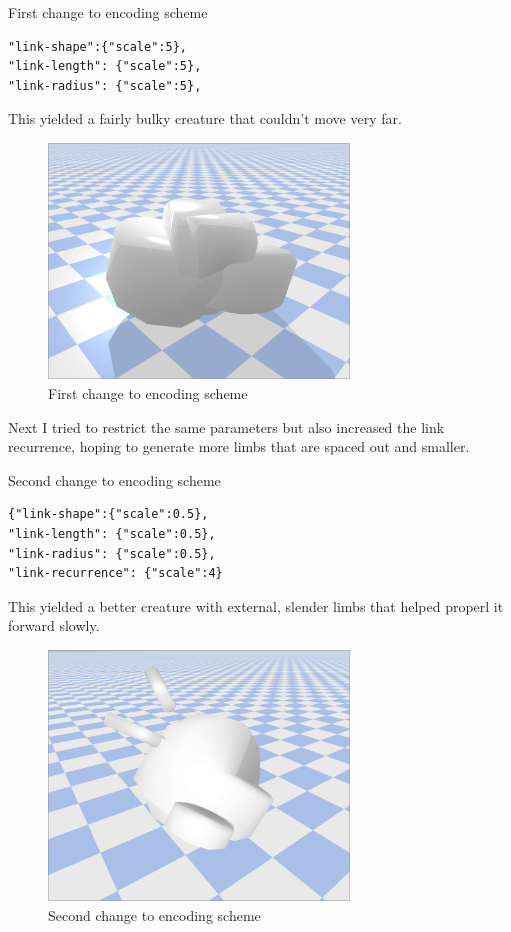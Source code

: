 \begin{listing}[H]
    \caption{First change to encoding scheme}
    \begin{lstlisting}
"link-shape":{"scale":5}, 
"link-length": {"scale":5},
"link-radius": {"scale":5},
    \end{lstlisting}
\end{listing}


This yielded a fairly bulky creature that couldn't move very far.

\begin{figure}[H]
    \centering
    \includegraphics[width=8cm]{cr1}
    \caption{First change to encoding scheme}
    \label{fig:cr1}
\end{figure}


Next I tried to restrict the same parameters but also increased the link recurrence, hoping to generate more limbs that are spaced out and smaller.

\begin{listing}[H]
    \caption{Second change to encoding scheme}
    \begin{lstlisting}
{"link-shape":{"scale":0.5}, 
"link-length": {"scale":0.5},
"link-radius": {"scale":0.5},
"link-recurrence": {"scale":4}\end{lstlisting}
\end{listing}

This yielded a better creature with external, slender limbs that helped properl it forward slowly.

\begin{figure}[H]
    \centering
    \includegraphics[width=8cm]{cr2}
    \caption{Second change to encoding scheme}
    \label{fig:cr2}
\end{figure}


